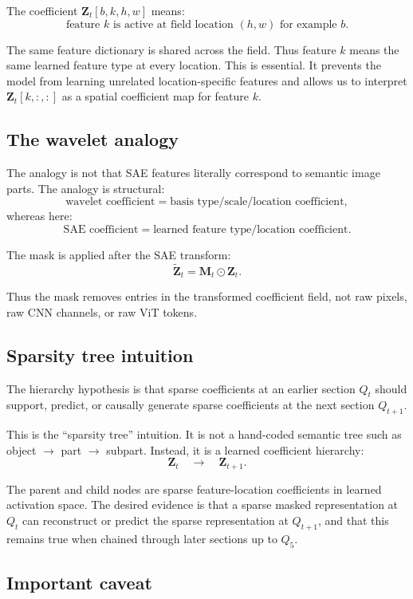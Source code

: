 \documentclass[11pt]{article}
\newcommand{\Ztens}{\mathbf{Z}}
\newcommand{\Mtens}{\mathbf{M}}
\newcommand{\Ztilde}{\widetilde{\mathbf{Z}}}
\begin{document}
The coefficient \(\Ztens_t[b,k,h,w]\) means:
\[
\text{feature } k \text{ is active at field location } (h,w) \text{ for example } b.
\]

The same feature dictionary is shared across the field. Thus feature \(k\) means the same learned feature type at every location. This is essential. It prevents the model from learning unrelated location-specific features and allows us to interpret \(\Ztens_t[k,:,:]\) as a spatial coefficient map for feature \(k\).

\subsection{The wavelet analogy}

The analogy is not that SAE features literally correspond to semantic image parts. The analogy is structural:
\[
\text{wavelet coefficient}
=
\text{basis type/scale/location coefficient},
\]
whereas here:
\[
\text{SAE coefficient}
=
\text{learned feature type/location coefficient}.
\]

The mask is applied after the SAE transform:
\[
\Ztilde_t = \Mtens_t \odot \Ztens_t.
\]

Thus the mask removes entries in the transformed coefficient field, not raw pixels, raw CNN channels, or raw ViT tokens.

\subsection{Sparsity tree intuition}

The hierarchy hypothesis is that sparse coefficients at an earlier section \(Q_t\) should support, predict, or causally generate sparse coefficients at the next section \(Q_{t+1}\).

This is the ``sparsity tree'' intuition. It is not a hand-coded semantic tree such as object \(\rightarrow\) part \(\rightarrow\) subpart. Instead, it is a learned coefficient hierarchy:
\[
\Ztens_t
\quad\longrightarrow\quad
\Ztens_{t+1}.
\]

The parent and child nodes are sparse feature-location coefficients in learned activation space. The desired evidence is that a sparse masked representation at \(Q_t\) can reconstruct or predict the sparse representation at \(Q_{t+1}\), and that this remains true when chained through later sections up to \(Q_5\).

\subsection{Important caveat}
\end{document}
